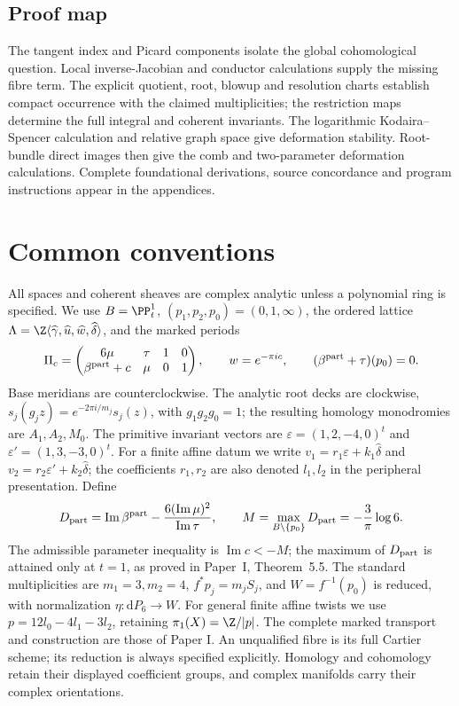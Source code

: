 \subsection*{Proof map}
The tangent index and Picard components isolate the global cohomological
question. Local inverse-Jacobian and conductor calculations supply the
missing fibre term. The explicit quotient, root, blowup and resolution
charts establish compact occurrence with the claimed multiplicities;
the restriction maps determine the full integral and coherent invariants.
The logarithmic Kodaira--Spencer calculation and relative graph space
give deformation stability. Root-bundle direct images then give the
comb and two-parameter deformation calculations. Complete foundational
derivations, source concordance and program instructions appear in the
appendices.

\clearpage
\section{Common conventions}
\label{sec:II:conventions}
All spaces and coherent sheaves are complex analytic unless a polynomial
ring is specified. We use $B=\PP^1_t$, $(p_1,p_2,p_0)=(0,1,\infty)$,
the ordered lattice
$\Lambda=\Z\langle\widehat\gamma,\widehat u,\widehat w,\widehat\delta\rangle$,
and the marked periods
\[
\Pi_c=\begin{pmatrix}6\mu&\tau&1&0\\\beta^{\rm part}+c&\mu&0&1\end{pmatrix},
\qquad w=e^{-\pi i c},\qquad (\beta^{\rm part}+\tau)(p_0)=0.
\]
Base meridians are counterclockwise. The analytic root decks are clockwise,
$s_j(g_jz)=e^{-2\pi i/m_j}s_j(z)$, with $g_1g_2g_0=1$;
the resulting homology monodromies are $A_1,A_2,M_0$.
The primitive invariant vectors are
$\varepsilon=(1,2,-4,0)^t$ and
$\varepsilon'=(1,3,-3,0)^t$.
For a finite affine datum we write
$v_1=r_1\varepsilon+k_1\widehat\delta$ and
$v_2=r_2\varepsilon'+k_2\widehat\delta$; the coefficients
$r_1,r_2$ are also denoted $l_1,l_2$ in the peripheral presentation.
Define
\[
 D_{\rm part}=\operatorname{Im}\beta^{\rm part}
       -\frac{6(\operatorname{Im}\mu)^2}{\operatorname{Im}\tau},
 \qquad M=\max_{B\setminus\{p_0\}}D_{\rm part}
       =-\frac3\pi\log6.
\]
The admissible parameter inequality is $\operatorname{Im}c<-M$;
the maximum of $D_{\rm part}$ is attained only at $t=1$, as proved in Paper~I,
Theorem~5.5.
The standard multiplicities are $m_1=3,m_2=4$,
$f^*p_j=m_jS_j$, and $W=f^{-1}(p_0)$ is reduced, with normalization
$\eta:\mathrm dP_6\to W$.
For general finite affine twists we use
$p=12l_0-4l_1-3l_2$, retaining $\pi_1(X)=\Z/|p|$.
The complete marked transport and construction are those of Paper I.
An unqualified fibre is its full Cartier scheme; its reduction is always
specified explicitly. Homology and cohomology retain their displayed
coefficient groups, and complex manifolds carry their complex orientations.
